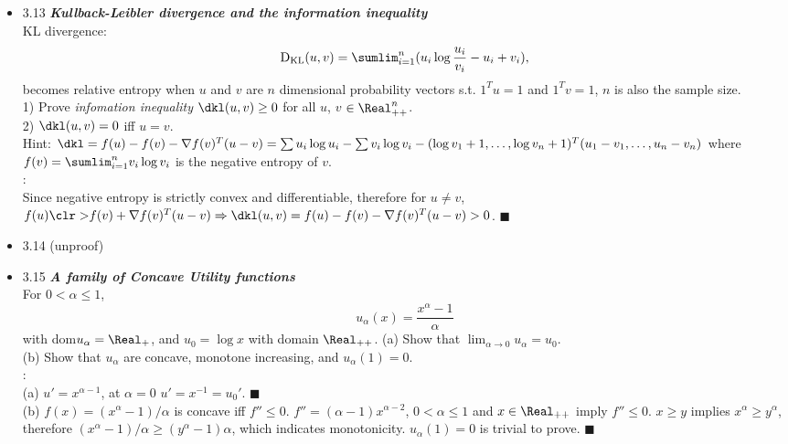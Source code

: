 \begin{itemize}
\item 3.13 {\bf\emph{Kullback-Leibler divergence and the information inequality}} \\ KL divergence:
\begin{equation} 
   \text{D}_{\text{KL}}(u,v)=\sumlim_{i=1}^n(u_i\log{\frac{u_i}{v_i}}-u_i+v_i),
\end{equation} 
becomes relative entropy when $u$ and $v$ are $n$ dimensional probability vectors
s.t. $1^Tu=1$ and $1^Tv=1$, $n$ is also the sample size. \\ 1) Prove \emph{infomation inequality}
$\dkl(u,v) \ge 0$ for all $u$, $v$ $\in \Real^n_{++}$. \\ 2) $\dkl(u,v)=0$ iff $u=v$. \\ Hint: $\dkl
= f(u)-f(v)-\nabla f(v)^T(u-v)= \sum u_i\log u_i - \sum v_i\log v_i - (\log v_1+ 1, \dotsc, \log
v_n+ 1)^T(u_1-v_1,\dotsc, u_n-v_n)$ where $f(v)=\sumlim_{i=1}^n v_i\log v_i$ is the negative entropy
of $v$.\\ \Proof: \\ Since negative entropy is {\clr strictly convex} and differentiable, therefore
for $u\neq v$, $f(u) {\clr >} f(v)+ \nabla f(v)^T(u-v) \Rightarrow \dkl(u,v)= f(u)-f(v)-\nabla
f(v)^T(u-v) > 0$.  $\blacksquare$ \\

\item 3.14 (unproof) 

\item 3.15 {\bf\emph{A family of Concave Utility functions}} \\ For $0<\alpha\le 1$,
\begin{equation} 
   u_\alpha(x)= \frac{x^\alpha- 1}{\alpha} 
\end{equation} 
with dom$u_\alpha = \Real_{+}$, and $u_0=\log x$ with domain $\Real_{++}$.  (a) Show that $\lim_{\alpha \rightarrow 0}
u_\alpha = u_0$. \\ (b) Show that $u_\alpha$ are concave, monotone increasing, and $u_\alpha(1)=0$.
\\ \Proof: \\ (a) $u'= x^{\alpha-1}$, at $\alpha=0$ $u'=x^{-1}=u_0'$.  $\blacksquare$  \\ (b)
$f(x)=(x^\alpha-1)/\alpha$ is concave iff $f''\le 0$.  $f''=(\alpha-1)x^{\alpha-2}$, $0< \alpha\le
1$ and $x\in \Real_{++}$ imply $f''\le 0$.  $x\ge y$ implies $x^\alpha \ge y^\alpha$, therefore
$(x^\alpha-1)/\alpha \ge (y^\alpha-1)\alpha$, which indicates monotonicity.  $u_\alpha(1)=0$ is
trivial to prove.  $\blacksquare$ \\


\end{itemize}

